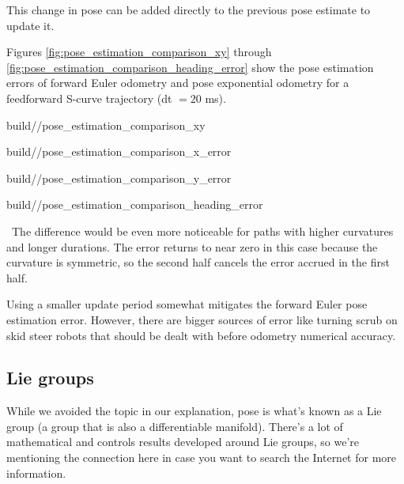 \begin{theorem}
  This change in pose can be added directly to the previous pose estimate to
  update it.
\end{theorem}

Figures \ref{fig:pose_estimation_comparison_xy} through
\ref{fig:pose_estimation_comparison_heading_error} show the pose estimation
errors of forward Euler odometry and pose exponential odometry for a feedforward
S-curve trajectory (dt $= 20$ ms).
\begin{bookfigure}
  \begin{minisvg}{2}{build/\chapterpath/pose_estimation_comparison_xy}
    \caption{Pose estimation comparison\\(y vs x)}
    \label{fig:pose_estimation_comparison_xy}
  \end{minisvg}
  \hfill
  \begin{minisvg}{2}{build/\chapterpath/pose_estimation_comparison_x_error}
    \caption{Pose estimation  comparison\\(x error vs time)}
  \end{minisvg}
\end{bookfigure}
\begin{bookfigure}
  \begin{minisvg}{2}{build/\chapterpath/pose_estimation_comparison_y_error}
    \caption{Pose estimation comparison\\(y error vs time)}
  \end{minisvg}
  \begin{minisvg}{2}{build/\chapterpath/pose_estimation_comparison_heading_error}
    \caption{Pose estimation comparison\\(heading error vs time)}
    \label{fig:pose_estimation_comparison_heading_error}
  \end{minisvg}
\end{bookfigure}

\unskip~The
difference would be even more noticeable for paths with higher curvatures and
longer durations. The error returns to near zero in this case because the
curvature is symmetric, so the second half cancels the error accrued in the
first half.

Using a smaller update period somewhat mitigates the forward Euler pose
estimation error. However, there are bigger sources of error like turning scrub
on skid steer robots that should be dealt with before odometry numerical
accuracy.

\subsection{Lie groups}

While we avoided the topic in our explanation, pose is what's known as a Lie
group (a group that is also a differentiable manifold). There's a lot of
mathematical and controls results  developed around Lie groups, so we're
mentioning the connection here in case you want to search the Internet for more
information.
